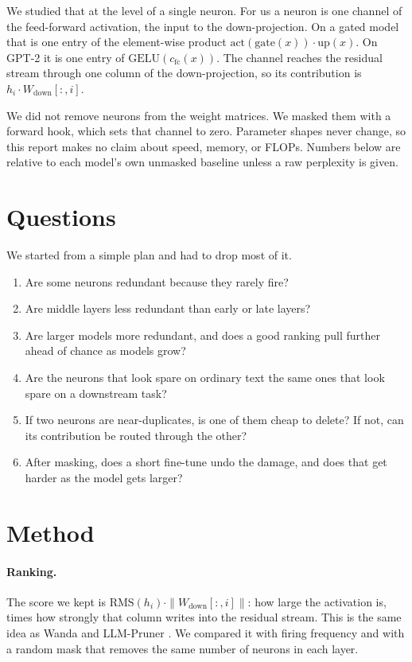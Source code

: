 \documentclass{article}
\begin{document}
We studied that at the level of a single neuron.
For us a neuron is one channel of the feed-forward activation, the input to the down-projection.
On a gated model that is one entry of the element-wise product $\mathrm{act}(\mathrm{gate}(x)) \cdot \mathrm{up}(x)$.
On GPT-2 it is one entry of $\mathrm{GELU}(c_{\mathrm{fc}}(x))$.
The channel reaches the residual stream through one column of the down-projection, so its contribution is $h_i \cdot W_{\mathrm{down}}[:, i]$.

We did not remove neurons from the weight matrices.
We masked them with a forward hook, which sets that channel to zero.
Parameter shapes never change, so this report makes no claim about speed, memory, or FLOPs.
Numbers below are relative to each model's own unmasked baseline unless a raw perplexity is given.

\section{Questions}
\label{sec:questions}

We started from a simple plan and had to drop most of it.
\begin{enumerate}
  \item Are some neurons redundant because they rarely fire?
  \item Are middle layers less redundant than early or late layers?
  \item Are larger models more redundant, and does a good ranking pull further ahead of chance as models grow?
  \item Are the neurons that look spare on ordinary text the same ones that look spare on a downstream task?
  \item If two neurons are near-duplicates, is one of them cheap to delete? If not, can its contribution be routed through the other?
  \item After masking, does a short fine-tune undo the damage, and does that get harder as the model gets larger?
\end{enumerate}

\section{Method}
\label{sec:method}

\paragraph{Ranking.}
The score we kept is $\mathrm{RMS}(h_i) \cdot \|W_{\mathrm{down}}[:, i]\|$: how large the activation is, times how strongly that column writes into the residual stream.
This is the same idea as Wanda \citep{sun2024wanda} and LLM-Pruner \citep{ma2023llmpruner}.
We compared it with firing frequency and with a random mask that removes the same number of neurons in each layer.
\end{document}
